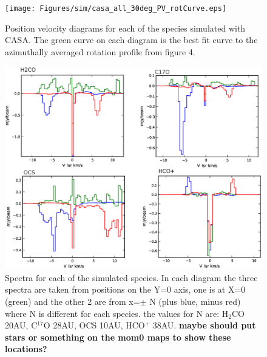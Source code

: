 \documentclass[useAMS,usenatbib]{mn2e}
\begin{document}
%

\begin{figure}
 \texttt{[image: Figures/sim/casa\_all\_30deg\_PV\_rotCurve.eps]}

 \caption{Position velocity diagrams for each of the species simulated with CASA. The green curve on each diagram is the best fit curve to the azimuthally averaged rotation profile from figure 4.}
\end{figure}


\begin{figure}
 \includegraphics[width=168mm]{Figures/sim/casa_all_spectra.eps}

 \caption{Spectra for each of the simulated species. In each diagram the three spectra are taken from positions on the Y=0 axis, one is at X=0 (green) and the other 2 are from x=$\pm$ N (plus blue, minus red) where N is different for each species. the values for N are: H$_2$CO 20AU, C$^{17}$O 28AU, OCS 10AU, HCO$^+$ 38AU. {\bf maybe should put stars or something on the mom0 maps to show these locations?}}
\end{figure}

%
\end{document}
